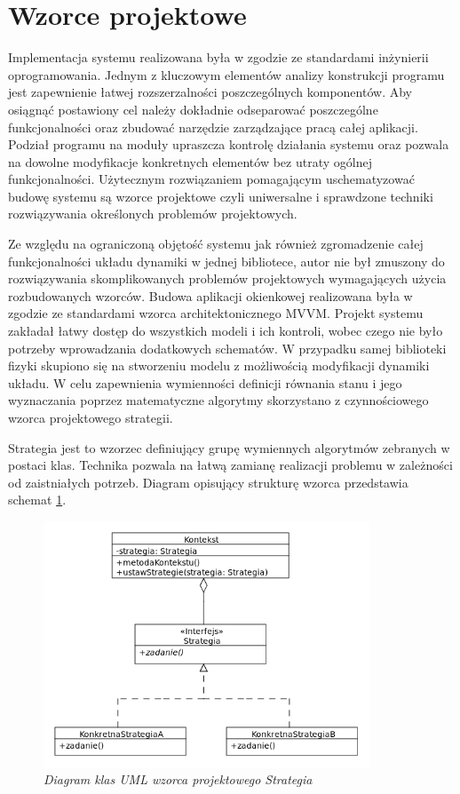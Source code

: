 \documentclass[12pt, oneside]{report}
\theoremstyle{definition}
\begin{document}
\section{Wzorce projektowe}
Implementacja systemu realizowana była w zgodzie ze standardami inżynierii oprogramowania. Jednym z kluczowym elementów analizy konstrukcji programu jest zapewnienie łatwej rozszerzalności poszczególnych komponentów. Aby osiągnąć postawiony cel należy dokładnie odseparować poszczególne funkcjonalności oraz zbudować narzędzie zarządzające pracą całej aplikacji. Podział programu na moduły upraszcza kontrolę działania systemu oraz pozwala na dowolne modyfikacje konkretnych elementów bez utraty ogólnej funkcjonalności. Użytecznym rozwiązaniem pomagającym uschematyzować budowę systemu są wzorce projektowe czyli uniwersalne i sprawdzone techniki rozwiązywania określonych problemów projektowych. 

Ze względu na ograniczoną objętość systemu jak również zgromadzenie całej funkcjonalności układu dynamiki w jednej bibliotece, autor nie był zmuszony do rozwiązywania skomplikowanych problemów projektowych wymagających użycia rozbudowanych wzorców. Budowa aplikacji okienkowej realizowana była w zgodzie ze standardami wzorca architektonicznego MVVM. Projekt systemu zakładał łatwy dostęp do wszystkich modeli i ich kontroli, wobec czego nie było potrzeby wprowadzania dodatkowych schematów. W przypadku samej biblioteki fizyki skupiono się na stworzeniu modelu z możliwością modyfikacji dynamiki układu. W celu zapewnienia wymienności definicji równania stanu i jego wyznaczania poprzez matematyczne algorytmy skorzystano z czynnościowego wzorca projektowego strategii.

Strategia jest to wzorzec definiujący grupę wymiennych algorytmów zebranych w postaci klas. Technika pozwala na łatwą zamianę realizacji problemu w zależności od zaistniałych potrzeb. Diagram opisujący strukturę wzorca przedstawia schemat \ref{StrategyPattern}.

\begin{figure}[H]
	\centering
		\includegraphics[width = 275pt]{StrategyPattern} 
		\caption{\textit{Diagram klas UML wzorca projektowego Strategia}}
		\label{StrategyPattern}
\end{figure}
\end{document}
